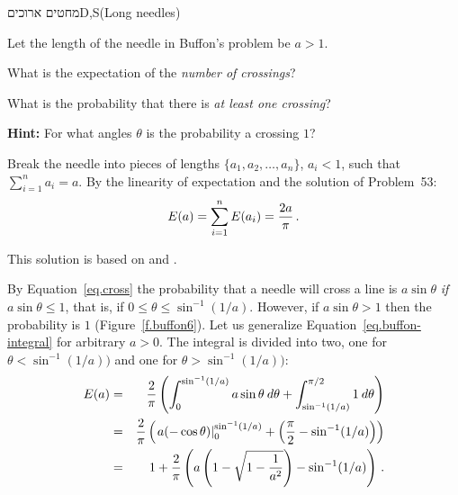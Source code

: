 
\begin{prob}{מחטים ארוכים}{D,S}{(Long needles)}

Let the length of the needle in Buffon's problem be $a>1$.

 What is the expectation of the \emph{number of crossings}?

 What is the probability that there is \emph{at least one crossing}?

\textbf{Hint:} For what angles $\theta$ is the probability a crossing $1$?

\end{prob}

\solution{}

 Break the needle into pieces of lengths $\{a_1,a_2,\ldots, a_n\}$, $a_i< 1$, such that $\sum_{i=1}^n a_i=a$. By the linearity of expectation and the solution of Problem~53:
\[
E(a)= \sum_{i=1}^n E(a_i)= \displaystyle\frac{2a}{\pi}\,.
\]

 This solution is based on \cite{wiki-buffon} and \cite[Chapter~26]{proofs}.

By Equation~\ref{eq.cross} the probability that a needle will cross a line is $a\sin\theta$ \emph{if} $a\sin\theta \leq 1$, that is, if $0\leq\theta\leq\sin^{-1}(1/a)$. However, if $a\sin\theta > 1$ then the probability is $1$ (Figure~\ref{f.buffon6}). Let us generalize Equation~\ref{eq.buffon-integral} for arbitrary $a>0$. The integral is divided into two, one for $\theta<\sin^{-1}(1/a))$ and one for $\theta>\sin^{-1}(1/a))$:
\begin{eqnarray*}
E(a) &=& \displaystyle\frac{2}{\pi}
   \left(\int_{0}^{\sin^{-1}(1/a)} 
   a\sin \theta\:d\theta + 
   \int_{\sin^{-1}(1/a)}^{\pi/2} 1\: d\theta\right)\\
&=& \displaystyle\frac{2}{\pi}\left(\left.
    a(-\cos \theta)\right|_0^{\sin^{-1}(1/a)} + 
    \left(\displaystyle\frac{\pi}{2} - 
    \sin^{-1}(1/a)\right)\right)\\
&=& 1+\displaystyle\frac{2}{\pi}
  \left(a
  \left(1-\sqrt{1-\displaystyle\frac{1}{a^2}}\right)-
  \sin^{-1}(1/a)\right)\,.
\end{eqnarray*}

